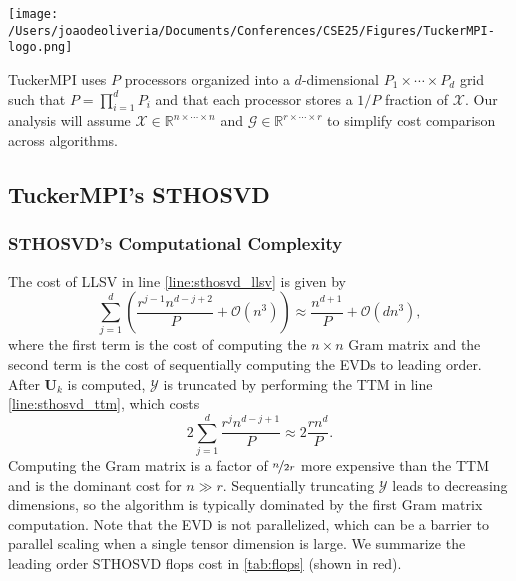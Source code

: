 
\begin{center}
    \texttt{[image: /Users/joaodeoliveria/Documents/Conferences/CSE25/Figures/TuckerMPI-logo.png]}
\end{center}

TuckerMPI uses $P$ processors organized into a $d$-dimensional $P_1\times \cdots
\times P_d$ grid such that $P = \prod_{i=1}^{d} P_i$ and that each processor
stores a $1/P$ fraction of $\mathcal{X}$. Our analysis will assume $\mathcal{X}
\in \mathbb{R}^{n\times \cdots \times n}$ and $\mathcal{G} \in
\mathbb{R}^{r\times \cdots \times r}$ to simplify cost comparison across
algorithms.

\subsection{TuckerMPI's STHOSVD} \label{sec:TuckerMPI's STHOSVD}
    \subsubsection{STHOSVD's Computational Complexity} \label{STHOSVD's Computational Complexity}

        The cost of LLSV in line \ref{line:sthosvd_llsv} is given by
        \begin{equation*}
            \sum_{j=1}^{d} \left(\frac{r^{j-1}n^{d-j+2}}{P} + \mathcal{O}(n^3)\right) \approx \frac{n^{d+1}}{P} + \mathcal{O}(dn^3),
        \end{equation*}
        where the first term is the cost of computing the $n \times n$ Gram matrix and
        the second term is the cost of sequentially computing the EVDs to leading order.
        After $\mathbf{U}_{k}$ is computed, $\mathcal{Y}$ is truncated by
        performing the TTM in line \ref{line:sthosvd_ttm}, which costs
        \begin{equation*}
            2\sum_{j=1}^{d} \frac{r^j n^{d-j+1}}{P} \approx 2\frac{rn^d}{P}.
        \end{equation*}
        Computing the Gram matrix is a factor of $\nicefrac{n}{2r}$ more expensive than
        the TTM and is the dominant cost for $n \gg r$. Sequentially truncating $\mathcal{Y}$
        leads to decreasing dimensions, so the algorithm is typically dominated by the
        first Gram matrix computation. Note that the EVD is not parallelized, which can
        be a barrier to parallel scaling when a single tensor dimension is large. We
        summarize the leading order STHOSVD flops cost in \cref{tab:flops} (shown in
        red).

